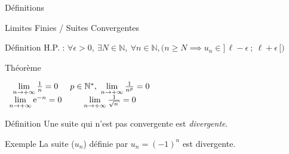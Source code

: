 \documentclass{coursbook}
\begin{document}
\begin{Gpartie}{Définitions}
\begin{Spartie}{Limites Finies / Suites Convergentes}
\begin{SSpartie}{Définition}
                H.P. : $\forall\epsilon >0,~\exists N\in\mathbb{N},~\forall n\in\mathbb{N}, \Big(n\geq N\implies u_n\in\big]\,\ell-\epsilon~;~\ell+\epsilon\,\big[\Big)$
            \end{SSpartie}
            \begin{SSpartie}{Théorème} 
                \begin{center}$\begin{array}{cc}
                    \lim\limits_{n\to +\infty}\frac{1}{n}=0 & p\in\mathbb{N^*},\ \lim\limits_{n\to +\infty}\frac{1}{n^p}=0 \\
                    \lim\limits_{n\to +\infty}\me^{-n}=0 & \lim\limits_{n\to +\infty}\frac{1}{\sqrt{n}}=0
                \end{array}$\end{center}
            \end{SSpartie}
            \begin{SSpartie}{Définition} 
                Une suite qui n'est pas convergente est \emph{divergente}.
            \end{SSpartie}
            \begin{SSpartie}{Exemple} 
                La suite ($u_n$) définie par $u_n=(-1)^n$ est divergente.
            \end{SSpartie}
        \end{Spartie}
    \end{Gpartie}
\end{document}
